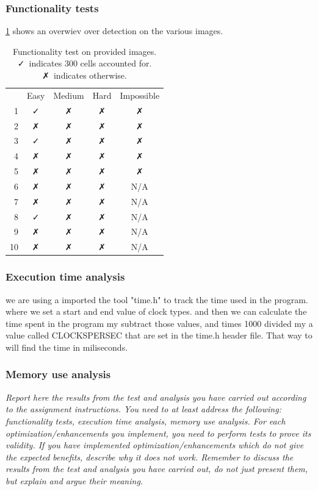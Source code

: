 \documentclass[a4paper, english]{article}
\numberwithin{equation}{section}
\begin{document}
\subsubsection{Functionality tests}
\cref{tbl:pocfunc} shows an overwiev over detection on the various images.
\begin{table}
    \centering
    \caption{Functionality test on provided images. \faCheck \ indicates 300 cells accounted for. \faClose \ indicates otherwise.}\label{tbl:pocfunc}
    \begin{tabular}{rcccc}
           & Easy     & Medium   & Hard     & Impossible \\
        1  & \faCheck & \faClose & \faClose & \faClose   \\
        2  & \faClose & \faClose & \faClose & \faClose   \\
        3  & \faCheck & \faClose & \faClose & \faClose   \\
        4  & \faClose & \faClose & \faClose & \faClose   \\
        5  & \faClose & \faClose & \faClose & \faClose   \\
        6  & \faClose & \faClose & \faClose & N/A        \\
        7  & \faClose & \faClose & \faClose & N/A        \\
        8  & \faCheck & \faClose & \faClose & N/A        \\
        9  & \faClose & \faClose & \faClose & N/A        \\
        10 & \faClose & \faClose & \faClose & N/A        \\
    \end{tabular}
\end{table}
\subsubsection{Execution time analysis}
we are using a imported the tool "time.h" to track the time used in the program. where we set a start and end value of clock types. and then we can calculate the time spent in the program my subtract those values, and times 1000 divided my a value called CLOCKS\textunderscore PER\textunderscore SEC that are set in the time.h header file.  That way to will find the time in miliseconds. 

\subsubsection{Memory use analysis}
\textit{Report here the results from the test and analysis you have carried out according to the assignment instructions.  You need to at least address the following: functionality tests, execution time analysis, memory use analysis.
    For each optimization/enhancements you implement, you need to perform tests to prove its validity. If you have implemented optimization/enhancements which do not give the expected benefits, describe why it does not work.
    Remember to discuss the results from the test and analysis you have carried out, do not just present them, but explain and argue their meaning.}
\end{document}
